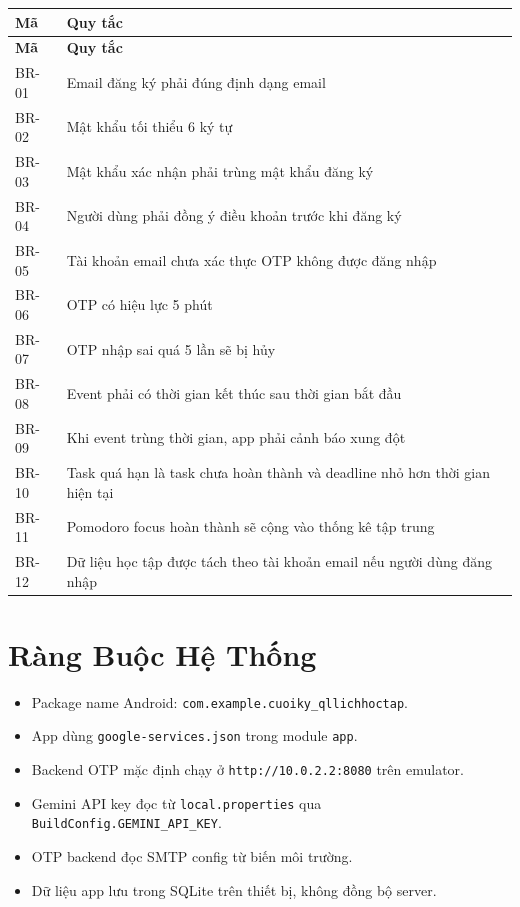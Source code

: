 \documentclass[12pt,a4paper]{report}
\begin{document}
\begin{longtable}{|>{\raggedright\arraybackslash}p{}|>{\raggedright\arraybackslash}p{}|}
\hline
\textbf{Mã} & \textbf{Quy tắc} \\ \hline
\endfirsthead
\hline
\textbf{Mã} & \textbf{Quy tắc} \\ \hline
\endhead
BR-01 & Email đăng ký phải đúng định dạng email \\ \hline
BR-02 & Mật khẩu tối thiểu 6 ký tự \\ \hline
BR-03 & Mật khẩu xác nhận phải trùng mật khẩu đăng ký \\ \hline
BR-04 & Người dùng phải đồng ý điều khoản trước khi đăng ký \\ \hline
BR-05 & Tài khoản email chưa xác thực OTP không được đăng nhập \\ \hline
BR-06 & OTP có hiệu lực 5 phút \\ \hline
BR-07 & OTP nhập sai quá 5 lần sẽ bị hủy \\ \hline
BR-08 & Event phải có thời gian kết thúc sau thời gian bắt đầu \\ \hline
BR-09 & Khi event trùng thời gian, app phải cảnh báo xung đột \\ \hline
BR-10 & Task quá hạn là task chưa hoàn thành và deadline nhỏ hơn thời gian hiện tại \\ \hline
BR-11 & Pomodoro focus hoàn thành sẽ cộng vào thống kê tập trung \\ \hline
BR-12 & Dữ liệu học tập được tách theo tài khoản email nếu người dùng đăng nhập \\ \hline
\end{longtable}

\section{Ràng Buộc Hệ Thống}

\begin{itemize}
\item Package name Android: \texttt{com.example.cuoiky\_qllichhoctap}.
\item App dùng \texttt{google-services.json} trong module \texttt{app}.
\item Backend OTP mặc định chạy ở \texttt{http://10.0.2.2:8080} trên emulator.
\item Gemini API key đọc từ \texttt{local.properties} qua \texttt{BuildConfig.GEMINI\_API\_KEY}.
\item OTP backend đọc SMTP config từ biến môi trường.
\item Dữ liệu app lưu trong SQLite trên thiết bị, không đồng bộ server.
\end{itemize}
\end{document}
